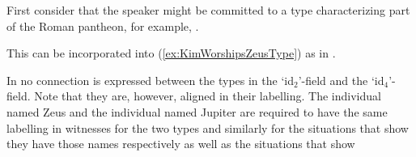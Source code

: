 First consider that the speaker might be committed to a type
characterizing part of the Roman pantheon, for example, \nexteg{}.
\begin{ex} 
\end{ex} 
This can be incorporated into (\ref{ex:KimWorshipsZeusType}) as in
\nexteg{}.
\begin{ex} 
\label{ex:KimWorshipsJupiterType}
\end{ex} 
In \preveg{} no connection is expressed between the types in the
`id$_2$'-field and the `id$_4$'-field.  Note that they are, however,
aligned in their labelling.  The individual named Zeus and the
individual named Jupiter are required to have the same labelling in
witnesses for the two types and similarly for the situations that show
they have those names respectively as well as the situations that show
